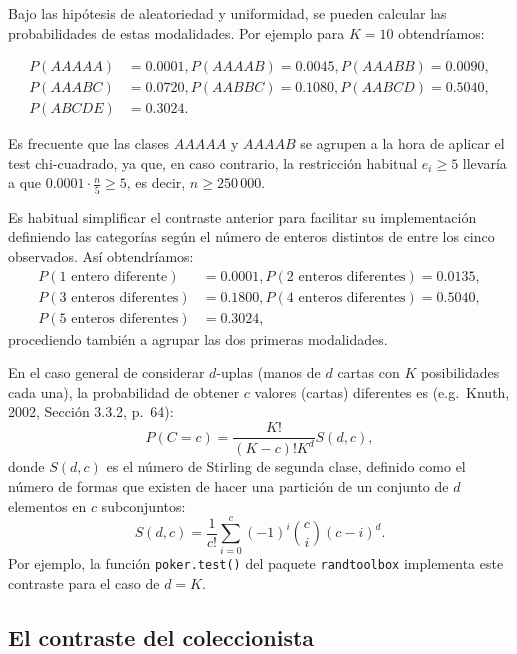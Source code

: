 \documentclass[
]{book}
\theoremstyle{break}
\theoremstyle{nonumberplain}
\begin{document}
Bajo las hipótesis de aleatoriedad y uniformidad, se pueden calcular las probabilidades de estas modalidades. Por ejemplo para \(K=10\) obtendríamos:

\[\begin{aligned}
P(AAAAA) & =0.0001, P(AAAAB)=0.0045, P(AAABB)=0.0090,\\
P(AAABC) & =0.0720, P(AABBC)=0.1080, P(AABCD)=0.5040,\\
P(ABCDE) & =0.3024.
\end{aligned}\]

Es frecuente que las clases \(AAAAA\) y \(AAAAB\) se agrupen a la hora de
aplicar el test chi-cuadrado, ya que, en caso contrario, la restricción
habitual \(e_{i}\geq5\) llevaría a que \(0.0001\cdot\frac{n}{5}\geq5\), es
decir, \(n\geq250\,000\).

Es habitual simplificar el contraste anterior para facilitar su implementación definiendo las categorías según el número de enteros distintos de entre los cinco observados.
Así obtendríamos:
\[\begin{aligned}
P(\text{1 entero diferente}) & = 0.0001,
P(\text{2 enteros diferentes}) = 0.0135,\\
P(\text{3 enteros diferentes}) & = 0.1800, 
P(\text{4 enteros diferentes}) = 0.5040,\\
P(\text{5 enteros diferentes}) & = 0.3024,
\end{aligned}\]
procediendo también a agrupar las dos primeras modalidades.

En el caso general de considerar \(d\)-uplas (manos de \(d\) cartas con \(K\) posibilidades cada una), la probabilidad de obtener \(c\) valores (cartas) diferentes es (e.g.~Knuth, 2002, Sección 3.3.2, p.~64):
\[P(C=c) = \frac{K!}{(K-c)!K^d}S(d,c),\]
donde \(S(d,c)\) es el número de Stirling de segunda clase, definido como el número de formas que existen de hacer una partición de un conjunto de \(d\) elementos en \(c\) subconjuntos:
\[S(d,c) = \frac{1}{c!}\sum_{i=0}^{c} (-1)^{i} \binom{c}{i} (c-i)^d.\]
Por ejemplo, la función \texttt{poker.test()} del paquete \texttt{randtoolbox} implementa este contraste para el caso de \(d=K\).

\hypertarget{el-contraste-del-coleccionista}{%
\subsection{El contraste del coleccionista}\label{el-contraste-del-coleccionista}}
\end{document}
